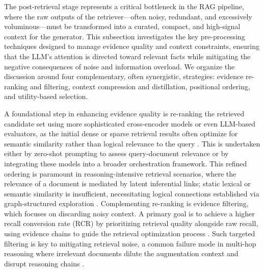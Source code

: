 \documentclass[11pt,a4paper]{article}
\begin{document}
The post-retrieval stage represents a critical bottleneck in the RAG pipeline, where the raw outputs of the retriever---often noisy, redundant, and excessively voluminous---must be transformed into a curated, compact, and high-signal context for the generator. This subsection investigates the key pre-processing techniques designed to manage evidence quality and context constraints, ensuring that the LLM's attention is directed toward relevant facts while mitigating the negative consequences of noise and information overload. We organize the discussion around four complementary, often synergistic, strategies: evidence re-ranking and filtering, context compression and distillation, positional ordering, and utility-based selection.

A foundational step in enhancing evidence quality is re-ranking the retrieved candidate set using more sophisticated cross-encoder models or even LLM-based evaluators, as the initial dense or sparse retrieval results often optimize for semantic similarity rather than logical relevance to the query \cite{arxiv:2507.00355v1}. This is undertaken either by zero-shot prompting to assess query-document relevance or by integrating these models into a broader orchestration framework. This refined ordering is paramount in reasoning-intensive retrieval scenarios, where the relevance of a document is mediated by latent inferential links; static lexical or semantic similarity is insufficient, necessitating logical connections established via graph-structured exploration \cite{arxiv:2502.12442v2,arxiv:2605.00063v1}. Complementing re-ranking is evidence filtering, which focuses on discarding noisy context. A primary goal is to achieve a higher recall conversion rate (RCR) by prioritizing retrieval quality alongside raw recall, using evidence chains to guide the retrieval optimization process \cite{arxiv:2604.27852v1}. Such targeted filtering is key to mitigating retrieval noise, a common failure mode in multi-hop reasoning where irrelevant documents dilute the augmentation context and disrupt reasoning chains \cite{arxiv:2502.14245v2,arxiv:2502.12442v2}.
\end{document}
